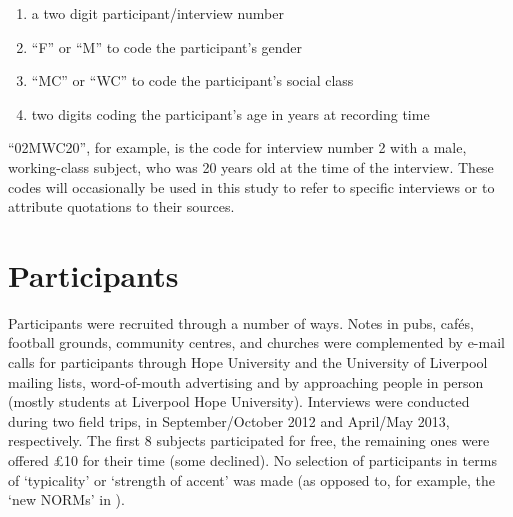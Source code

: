 \begin{enumerate}
	\item a two digit participant/interview number
	\item ``F'' or ``M'' to code the participant's gender
	\item ``MC'' or ``WC'' to code the participant's social class
	\item two digits coding the participant's age in years at recording time
\end{enumerate}

``02MWC20'', for example, is the code for interview number 2 with a male, working-class subject, who was 20 years old at the time of the interview.
These codes will occasionally be used in this study to refer to specific interviews or to attribute quotations to their sources.

	\section{Participants}\label{sec.prod_method.participants}
	
Participants were recruited through a number of ways. Notes in pubs, cafés, football grounds, community centres, and churches were complemented by e-mail calls for participants through Hope University and the University of Liverpool mailing lists, word-of-mouth advertising and by approaching people in person (mostly students at Liverpool Hope University). Interviews were conducted during two field trips, in September/October 2012 and April/May 2013, respectively. The first 8 subjects participated for free, the remaining ones were offered £10 for their time (some declined). No selection of participants in terms of `typicality' or `strength of accent' was made (as opposed to, for example, the `new NORMs' in \citealt{honeybone2001}).

